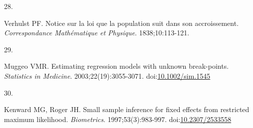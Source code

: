 \documentclass[
  11pt,
]{article}
\newlength{\cslhangindent}
\newlength{\csllabelwidth}
\newenvironment{CSLReferences}[2] %
 {\begin{list}{}{%
  \setlength{\itemindent}{0pt}
  \setlength{\leftmargin}{0pt}
  \setlength{\parsep}{0pt}
  \ifodd #1
   \setlength{\leftmargin}{\cslhangindent}
   \setlength{\itemindent}{-1\cslhangindent}
  \fi
  \setlength{\itemsep}{#2\baselineskip}}}
 {\end{list}}
\newcommand{\CSLLeftMargin}[1]{\parbox[t]{\csllabelwidth}{\strut#1\strut}}
\newcommand{\CSLRightInline}[1]{\parbox[t]{\linewidth - \csllabelwidth}{\strut#1\strut}}
\begin{document}
\begin{CSLReferences}{0}{1}
\CSLLeftMargin{28. }%
\CSLRightInline{Verhulst PF. Notice sur la loi que la population suit dans son accroissement. \emph{Correspondance Math{é}matique et Physique}. 1838;10:113-121.}

\CSLLeftMargin{29. }%
\CSLRightInline{Muggeo VMR. Estimating regression models with unknown break-points. \emph{Statistics in Medicine}. 2003;22(19):3055-3071. doi:\href{https://doi.org/10.1002/sim.1545}{10.1002/sim.1545}}

\CSLLeftMargin{30. }%
\CSLRightInline{Kenward MG, Roger JH. Small sample inference for fixed effects from restricted maximum likelihood. \emph{Biometrics}. 1997;53(3):983-997. doi:\href{https://doi.org/10.2307/2533558}{10.2307/2533558}}

\end{CSLReferences}
\end{document}
